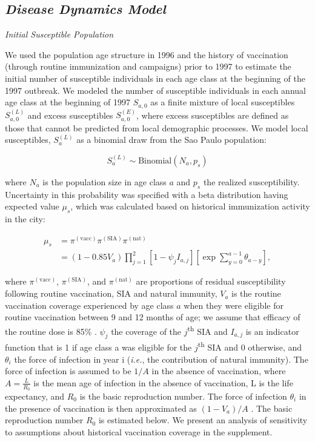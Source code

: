 \subsection{\texorpdfstring{\emph{Disease Dynamics
Model}}{Disease Dynamics Model}}\label{disease-dynamics-model}

\emph{Initial Susceptible Population}

We used the population age structure in 1996 and the history of vaccination (through routine immunization and campaigns) prior to 1997 to estimate the initial number of susceptible individuals in each age class at the beginning of the 1997 outbreak.  We modeled the number of susceptible individuals in each annual age class at the beginning of 1997 \(S_{a,0}\) as a finite mixture of local susceptibles \(S_{a,0}^{(L)}\) and excess susceptibles \(S_{a,0}^{(E)}\), where excess susceptibles are defined as those that cannot be predicted from local demographic processes.  We model local susceptibles, \(S_a^{(L)}\) as a binomial draw from the Sao Paulo population:

\begin{equation}
S_a^{(L)} \sim \text{Binomial}(N_a, p_s)
\end{equation}

where \(N_a\) is the population size in age class \(a\) and \(p_s\) the realized susceptibility. Uncertainty in this probability was specified with a beta distribution having expected value \(\mu_s\), which was calculated based on historical immunization activity in the city:

\begin{equation}
\begin{split}
\mu_s &= \pi^{(\text{vacc})} \pi^{(\text{SIA})}\pi^{(\text{nat})} \\
&= (1- 0.85 V_a) \prod_{j=1}^2 \left[1- \psi_j I_{a,j} \right] \left[\exp \sum_{y=0}^{a-1} \theta_{a-y} \right],
\end{split}
\end{equation}

where $\pi^{(\text{vacc})}$, $\pi^{(\text{SIA})}$, and $\pi^{(\text{nat})}$ are proportions of residual susceptibility following routine vaccination, SIA and natural immunity, \(V_a\) is the routine vaccination coverage experienced by age class \(a\) when they were eligible for routine vaccination between 9 and 12 months of age; we assume that efficacy of the routine dose is 85\% \cite{Uzicanin_2011}.  \(\psi_{j}\) the coverage of the \(j\)\textsuperscript{th} SIA and \(I_{a,j}\) is an indicator function that is 1 if age class a was eligible for the \(j\)\textsuperscript{th} SIA and 0 otherwise, and \(\theta_i\) the force of infection in year i (\emph{i.e.}, the contribution of natural immunity).  The force of infection is assumed to be \(1/A\) in the absence of vaccination, where \(A=\frac{L}{R_0}\) \cite{Anderson_1981} is the mean age of infection in the absence of vaccination, L is the life expectancy, and \(R_0\) is the basic reproduction number. The force of infection \(\theta_i\) in the presence of vaccination is then approximated as \((1-V_a)/A\) \cite{Anderson_1981}.  The basic reproduction number \(R_0\) is estimated below.  We present an analysis of sensitivity to assumptions about historical vaccination coverage in the supplement.

